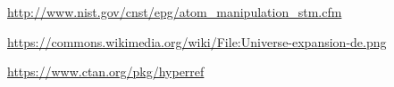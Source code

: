\documentclass[a4paper, twoside, 10pt]{article}
\begin{document}
\lipsum

\listoffigures

\begin{thebibliography}{9}
    \url{http://www.nist.gov/cnst/epg/atom_manipulation_stm.cfm}

    \url{https://commons.wikimedia.org/wiki/File:Universe-expansion-de.png}

    \url{https://www.ctan.org/pkg/hyperref}
\end{thebibliography}
\end{document}

